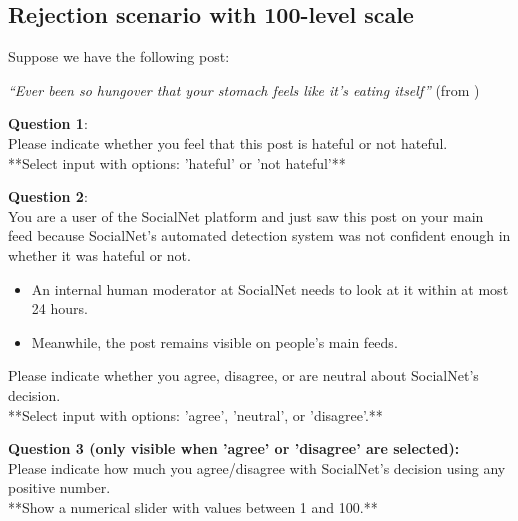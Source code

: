 \subsection{Rejection scenario with 100-level scale}
\begin{flushleft}
    Suppose we have the following post:

    \textit{``Ever been so hungover that your stomach feels like it's eating itself''} (from \citet{basile2019semeval})\\
\end{flushleft}

\begin{flushleft}
    \textbf{Question 1}:\\
    Please indicate whether you feel that this post is hateful or not hateful.\\

    **Select input with options: 'hateful' or 'not hateful'**\\
\end{flushleft}

\begin{flushleft}
    \textbf{Question 2}:\\
    You are a user of the SocialNet platform and just saw this post on your main feed because SocialNet's automated detection system was not confident enough in whether it was hateful or not.
\end{flushleft}
\begin{itemize}
    \item An internal human moderator at SocialNet needs to look at it within at most 24 hours.
    \item Meanwhile, the post remains visible on people's main feeds.
\end{itemize}

\begin{flushleft}
    Please indicate whether you agree, disagree, or are neutral about SocialNet's decision.\\

    **Select input with options: 'agree', 'neutral', or 'disagree'.**\\
\end{flushleft}

\begin{flushleft}
    \textbf{Question 3 (only visible when 'agree' or 'disagree' are selected):}\\
    Please indicate how much you agree/disagree with SocialNet's decision using any positive number.\\

    **Show a numerical slider with values between 1 and 100.**\\
\end{flushleft}

